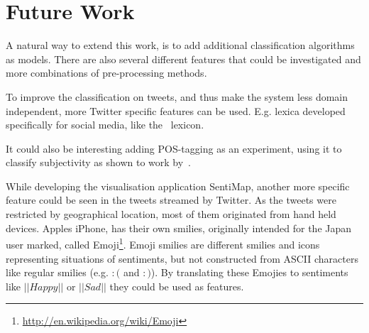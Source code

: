 \section{Future Work}

A natural way to extend this work, is to add additional classification algorithms as models. There are also several different features that could be investigated and more combinations of pre-processing methods. 

To improve the classification on tweets, and thus make the system less domain independent, more Twitter specific features can be used. E.g. lexica developed specifically for social media, like the~\citet{article:afinn} lexicon. 

It could also be interesting adding POS-tagging as an experiment, using it to classify subjectivity as shown to work by~\citet{article:pak}.

While developing the visualisation application SentiMap, another more specific feature could be seen in the tweets streamed by Twitter. As the tweets were restricted by geographical location, most of them originated from hand held devices. Apples iPhone, has their own smilies, originally intended for the Japan user marked, called Emoji\footnote{\url{http://en.wikipedia.org/wiki/Emoji}}. Emoji smilies are different smilies and icons representing situations of sentiments, but not constructed from ASCII characters like regular smilies (e.g. $:($ and $:)$). By translating these Emojies to sentiments like $||Happy||$ or $||Sad||$ they could be used as features.